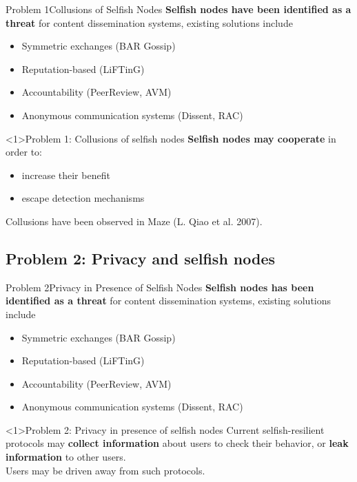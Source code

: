 \documentclass[10pt]{beamer}
\begin{document}
\begin{frame}{Problem 1}{Collusions of Selfish Nodes}
      \textbf{Selfish nodes have been identified as a  threat} for content dissemination systems, existing solutions include
         \begin{itemize}
            \item Symmetric exchanges (BAR Gossip)
            \item Reputation-based (LiFTinG)
            \item Accountability (PeerReview, AVM)
            \item Anonymous communication systems (Dissent, RAC)
         \end{itemize}

  \begin{block}<1>{Problem 1: Collusions of selfish nodes}
     \textbf{Selfish nodes may cooperate} in order to:
     \begin{itemize}
        \item increase their benefit 
        \item escape detection mechanisms
     \end{itemize}
     Collusions have been observed in Maze (L. Qiao et al. 2007).
  \end{block}  
\end{frame}

\subsection{Problem 2: Privacy and selfish nodes}

\begin{frame}{Problem 2}{Privacy in Presence of Selfish Nodes}
      \textbf{Selfish nodes has been identified as a threat} for content dissemination systems, existing solutions include
         \begin{itemize}
            \item Symmetric exchanges (BAR Gossip)
            \item Reputation-based (LiFTinG)
            \item Accountability (PeerReview, AVM)
            \item Anonymous communication systems (Dissent, RAC)
         \end{itemize}

  \begin{block}<1>{Problem 2: Privacy in presence of selfish nodes}
     Current selfish-resilient protocols may \textbf{collect information} about users to check their behavior, or \textbf{leak information} to other users. \\
     Users may be driven away from such protocols. 
  \end{block}  
\end{frame}
\end{document}
